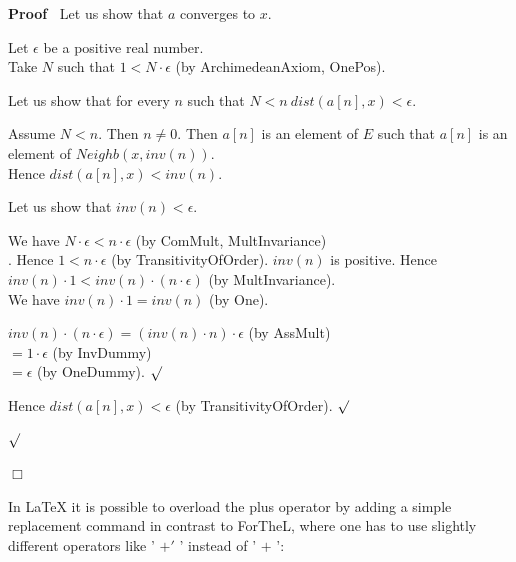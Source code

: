 \documentclass{article}
\newenvironment{forthel}{\begin{leftbar}}{\end{leftbar}}
\newenvironment{proof}{\noindent\textbf{Proof\ }}{\hspace*{\fill}$\Box$\medskip}
\newenvironment{subproof}{\begin{list}{}{}
		\item[\text{Proof}]}{\hfill $\surd$ \end{list}}
\newcommand{\dotequal}{=}
\begin{document}
\begin{forthel}
\begin{proof}
		\noindent Let us show that $a$ converges to $x$.
		\begin{subproof}
			Let $\epsilon$ be a positive real number.\\
			Take $N$ such that $1 < N \cdot \epsilon$ (by ArchimedeanAxiom, OnePos).
			
			\noindent Let us show that for every $n$ such that $N < n \ dist(a[n],x) < \epsilon$.
			\begin{subproof}
				Assume $N < n$. Then $n \neq 0$.
				Then $a[n]$ is an element of $E$ such that $a[n]$ is an element of $Neighb(x,inv(n))$.\\
				Hence $dist(a[n],x) < inv(n)$.
				
				\noindent Let us show that $inv(n) < \epsilon$.
				\begin{subproof}
					We have $N \cdot \epsilon < n \cdot \epsilon$ (by ComMult, MultInvariance)\\.
					Hence $1 < n \cdot \epsilon$ (by 	TransitivityOfOrder).
					$inv(n)$ is positive.
					Hence $inv(n) \cdot 1 < inv(n) \cdot (n \cdot \epsilon)$ (by MultInvariance).\\
					We have $inv(n) \cdot 1 = inv(n)$ (by One).
					
					$inv(n) \cdot (n \cdot \epsilon) \dotequal 		(inv(n) \cdot n) \cdot \epsilon$ (by AssMult)\\
					$\dotequal 1 \cdot \epsilon$ (by InvDummy)\\
					$\dotequal \epsilon$ (by OneDummy).
				\end{subproof}
				Hence $dist(a[n],x) < \epsilon$ (by 		TransitivityOfOrder).
			\end{subproof}
		\end{subproof}
	\end{proof}
\end{forthel}

\noindent In LaTeX it is possible to overload the plus operator by adding a simple replacement command in contrast to ForTheL, where one has to use slightly different operators like ' $+'$ ' instead of ' $+$ ':
\end{document}
